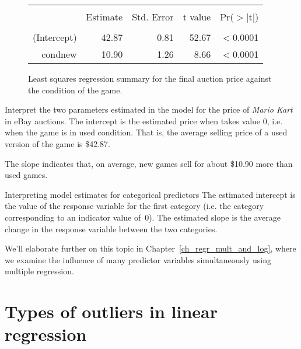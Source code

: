 \begin{figure}
\centering
\begin{tabular}{rrrrr}
  \hline
  \vspace{-3.7mm} & & & & \\
 & Estimate & Std. Error & t value & Pr($>$$|$t$|$) \\ 
  \hline
  \vspace{-3.6mm} & & & & \\
(Intercept) & 42.87 & 0.81 & 52.67 & $<$0.0001 \\ 
  cond\us{}new & 10.90 & 1.26 & 8.66 & $<$0.0001 \\ 
   \hline
\end{tabular}
\caption{Least squares regression summary for the final auction price against the condition of the game.}
\label{marioKartNewUsedRegrSummary}
\end{figure}

\begin{examplewrap}
\begin{nexample}{Interpret the two parameters estimated in the
    model for the price of \emph{Mario Kart} in eBay auctions.}
  The intercept is the estimated price when 
  takes value 0, i.e. when the game is in used condition.
  That is, the average selling price of a used version of
  the game is \$42.87.

  The slope indicates that, on average, new games sell for
  about \$10.90 more than used games.
\end{nexample}
\end{examplewrap}

\begin{onebox}{Interpreting model estimates for
    categorical predictors}
  The estimated intercept is the value of the response variable
  for the first category (i.e. the category corresponding to an
  indicator value of~0).
  The estimated slope is the average change in the response
  variable between the two categories.
\end{onebox}

We'll elaborate further on this topic in
Chapter~\ref{ch_regr_mult_and_log},
where we examine the influence of many
predictor variables simultaneously using
multiple regression.




\section{Types of outliers in linear regression}
\label{typesOfOutliersInLinearRegression}

